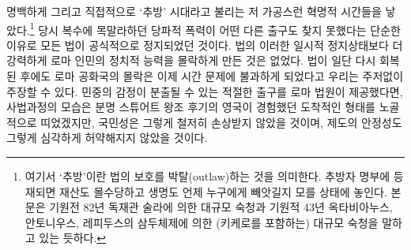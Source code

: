 명백하게 그리고 직접적으로
`추방' 시대라고 불리는
저 가공스런 혁명적 시간들을 낳았다.\footnote{%
  여기서 `추방'이란 법의 보호를 박탈(outlaw)하는 것을 의미한다.
  추방자 명부에 등재되면 재산도 몰수당하고 생명도 언제 누구에게 빼앗길지
  모를 상태에 놓인다.
  본문은 기원전 82년 독재관 술라에 의한 대규모 숙청과
  기원적 43년 옥타비아누스, 안토니우스, 레피두스의 삼두체제에 의한
  (키케로를 포함하는) 대규모 숙청을 말하고 있는 듯하다. }
당시
복수에 목말라하던
당파적 폭력이
어떤 다른 출구도 찾지 못했다는 단순한 이유로
모든 법이 공식적으로 정지되었던 것이다.
법의 이러한 일시적 정지상태보다 더 강력하게
로마 인민의 정치적 능력을 몰락하게 만든 것은 없었다.
법이 일단 다시 회복된 후에도
로마 공화국의 몰락은 이제 시간 문제에 불과하게 되었다고
우리는 주저없이 주장할 수 있다.
민중의 감정이 분출될 수 있는 적절한 출구를
로마 법원이
제공했다면,
사법과정의 모습은 분명
스튜어트 왕조 후기의 영국이 경험했던
도착적인 형태를 노골적으로 띠었겠지만,
국민성은 그렇게 철저히 손상받지 않았을 것이며,
제도의 안정성도 그렇게 심각하게 허약해지지 않았을 것이다.

